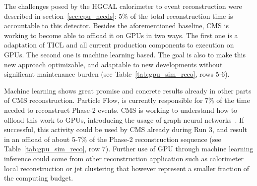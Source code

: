 \documentclass{cmspaper}
\begin{document}
The challenges posed by the HGCAL calorimeter to event reconstruction were described in section~\ref{sec:cpu_needs}: 5\% of the total reconstruction time is accountable to this detector. Besides the aforementioned baseline, CMS is working to become able to offload it on GPUs in two ways. The first one is a adaptation of TICL and all current production components to execution on GPUs. The second one is machine learning based. The goal is also to make this new approach optimizable, and adaptable to new developments without significant maintenance burden (see Table~\ref{tab:gpu_sim_reco}, rows 5-6). 

Machine learning shows great promise and concrete results already in other parts of CMS reconstruction. Particle Flow, is currently responsible for 7\% of the time needed to reconstruct Phase-2 events. CMS is working to understand how to offload this work to GPUs, introducing the usage of graph neural networks~\cite{Pata:2750781}. If successful, this activity could be used by CMS already during Run 3, and result in an offload of about 5-7\% of the Phase-2 reconstruction sequence (see Table~\ref{tab:gpu_sim_reco}, row 7). Further use of GPU through machine learning inference could come from other reconstruction application such as calorimeter local reconstruction or jet clustering that however represent a smaller fraction of the computing budget.
\end{document}
